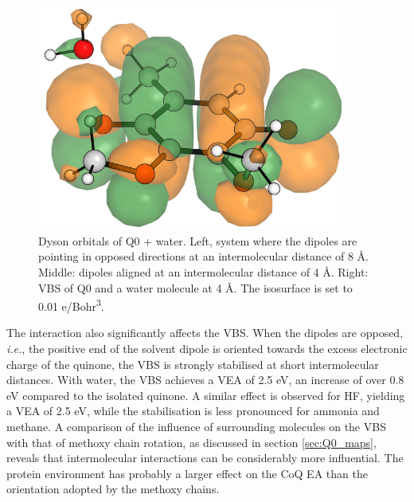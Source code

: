 \begin{figure}[h]
\begin{minipage}[b]{0.3\textwidth}
  \end{minipage}
  \hfill
  \begin{minipage}[b]{0.3\textwidth}
    \centering
    \includegraphics[width=0.9\textwidth]{chapters/results/image/Q0_H2O_VBS.png}
  \end{minipage}
  \caption[Dyson orbitals of Q0+water]{Dyson orbitals of Q0 + water. Left, system where the dipoles are pointing in opposed directions at an intermolecular distance of 8 \r{A}. Middle: dipoles aligned at an intermolecular distance of 4 \r{A}. Right: VBS of Q0 and a water molecule at 4 \r{A}. The isosurface is set to 0.01 e/Bohr\textsuperscript{3}.}
  \label{fig:Q1_dyson}
\end{figure}

The interaction also significantly affects the VBS. When the dipoles are opposed, \textit{i.e.}, the positive end of the solvent dipole is oriented towards the excess electronic charge of the quinone, the VBS is strongly stabilised at short intermolecular distances. With water, the VBS achieves a VEA of 2.5 eV, an increase of over 0.8 eV compared to the isolated quinone. A similar effect is observed for HF, yielding a VEA of 2.5 eV, while the stabilisation is less pronounced for ammonia and methane. A comparison of the influence of surrounding molecules on the VBS with that of methoxy chain rotation, as discussed in section \ref{sec:Q0_maps}, reveals that intermolecular interactions can be considerably more influential. The protein environment has probably a larger effect on the CoQ EA than the orientation adopted by the methoxy chains.

